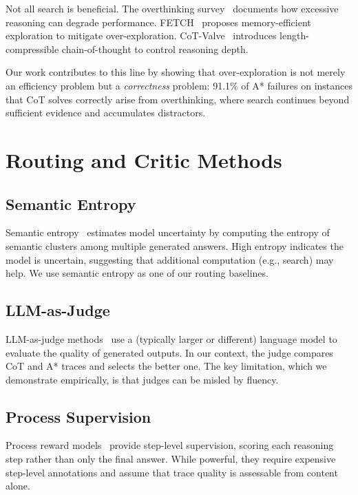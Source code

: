Not all search is beneficial. The overthinking survey~\citep{sui2025overthinking} documents how excessive reasoning can degrade performance. FETCH~\citep{wang2025fetch} proposes memory-efficient exploration to mitigate over-exploration. CoT-Valve~\citep{ma2025cotvalve} introduces length-compressible chain-of-thought to control reasoning depth.

Our work contributes to this line by showing that over-exploration is not merely an efficiency problem but a \emph{correctness} problem: 91.1\% of A* failures on instances that CoT solves correctly arise from overthinking, where search continues beyond sufficient evidence and accumulates distractors.

\section{Routing and Critic Methods}

\subsection{Semantic Entropy}

Semantic entropy~\citep{kossen2024semanticentropyprobesrobust} estimates model uncertainty by computing the entropy of semantic clusters among multiple generated answers. High entropy indicates the model is uncertain, suggesting that additional computation (e.g., search) may help. We use semantic entropy as one of our routing baselines.

\subsection{LLM-as-Judge}

LLM-as-judge methods~\citep{zheng2023judging} use a (typically larger or different) language model to evaluate the quality of generated outputs. In our context, the judge compares CoT and A* traces and selects the better one. The key limitation, which we demonstrate empirically, is that judges can be misled by fluency.

\subsection{Process Supervision}

Process reward models~\citep{lightman2023let} provide step-level supervision, scoring each reasoning step rather than only the final answer. While powerful, they require expensive step-level annotations and assume that trace quality is assessable from content alone.

